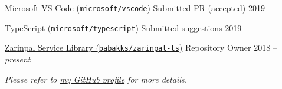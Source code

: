 \documentclass[10pt,a4paper]{article} %
\begin{document}

\spacedhrule{-0.2em}{-0.4em} %



\headedsection %
{\href{http://www.github.com/microsoft/vscode}{Microsoft VS Code (\texttt{microsoft/vscode})}}
{} {
\headedsubsection %
{Submitted PR (accepted)}
{2019}
{}
}

\headedsection %
{\href{http://www.github.com/microsoft/typescript}{TypeScript (\texttt{microsoft/typescript})}}
{} {
\headedsubsection %
{Submitted suggestions}
{2019}
{}
}

\headedsection %
{\href{http://www.github.com/babakks/zarinpal-ts}{Zarinpal Service Library (\texttt{babakks/zarinpal-ts})}}
{} {
\headedsubsection %
{Repository Owner}
{2018 -- \textit{present}}
{
}}

\begin{center}
\textit{Please refer to \href{http://www.github.com/babakks}{my GitHub profile} for more details.}
\end{center}


\spacedhrule{-0.2em}{-0.4em} %

\end{document}
